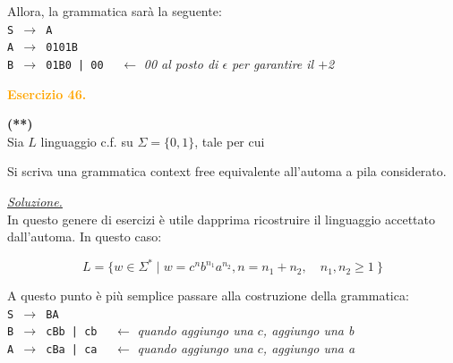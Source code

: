 \documentclass[a4paper,10pt]{article}
\begin{document}
{\begin{itemize}[label=, leftmargin=0pt]
\begin{osservazioni}
    Allora, la grammatica sarà la seguente:\\

    \texttt{S $\rightarrow$ A}\\
    \texttt{A $\rightarrow$ 0101B}\\
    \texttt{B $\rightarrow$ 01B0 | 00} $\quad \longleftarrow$ \textit{00 al posto di $\epsilon$ per garantire il $+$2}
    \end{osservazioni}
    
    \textcolor{orange}{\item \textbf{Esercizio 46. }}\textbf{(**)}\\ 
    Sia $L$ linguaggio c.f. su $\Sigma=\{0,1\}$, tale per cui 

    {
  \small
    \begin{center}
    \end{center}
    }
    
    Si scriva una grammatica context free equivalente all'automa a pila considerato.

    
\begin{osservazioni}
    
    \underline{\textit{Soluzione.}} \\
    In questo genere di esercizi è utile dapprima ricostruire il linguaggio accettato dall'automa. In questo caso:
    
    $$L=\{ w\in\Sigma^*\mid w=c^nb^{n_1}a^{n_2}, n=n_1+n_2, \quad n_1, n_2\geq1\ \}$$
    
    A questo punto è più semplice passare alla costruzione della grammatica:\\

    \texttt{S $\rightarrow$ BA}\\
    \texttt{B $\rightarrow$ cBb | cb} $\quad \longleftarrow$ \textit{quando aggiungo una $c$, aggiungo una b } \\
    \texttt{A $\rightarrow$ cBa | ca}  $\quad \longleftarrow$ \textit{quando aggiungo una $c$, aggiungo una a }
    \end{osservazioni}
    
\end{itemize}
}
\vfill
\noindent\makebox[\linewidth]{\rule{\linewidth}{0.1pt}}
\end{document}
